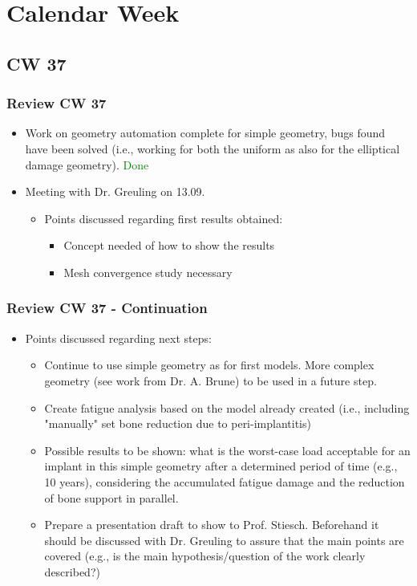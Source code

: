 \section{Calendar Week}
\subsection{CW 37}
\begin{frame}
  \frametitle{Review CW 37}
	\begin{itemize}
		\item Work on geometry automation complete for simple geometry, bugs found have been solved (i.e., working for both the uniform as also for the elliptical damage geometry). \textcolor{green}{Done}
		\item Meeting with Dr. Greuling on 13.09.
		\begin{itemize}
			\item Points discussed regarding first results obtained:
			\begin{itemize}
				\item Concept needed of how to show the results
				\item Mesh convergence study necessary
			\end{itemize}
		\end{itemize}
	\end{itemize}
\end{frame}
\begin{frame}
  \frametitle{Review CW 37 - Continuation}
	\begin{itemize}
		\item Points discussed regarding next steps:
		\begin{itemize}
			\item Continue to use simple geometry as for first models. More complex geometry (see work from Dr. A. Brune) to be used in a future step.
			\item Create fatigue analysis based on the model already created (i.e., including "manually" set bone reduction due to peri-implantitis)
			\item Possible results to be shown: what is the worst-case load acceptable for an implant in this simple geometry after a determined period of time (e.g., 10 years), considering the accumulated fatigue damage and the reduction of bone support in parallel.
			\item Prepare a presentation draft to show to Prof. Stiesch. Beforehand it should be discussed with Dr. Greuling to assure that the main points are covered (e.g., is the main hypothesis/question of the work clearly described?)
		\end{itemize}	
	\end{itemize}
\end{frame}

